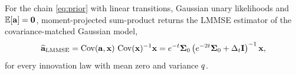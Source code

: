 
\begin{proposition}
\label{prop:lmmse}
For the chain \eqref{eq:prior} with linear transitions, Gaussian unary likelihoods and
$\mathbb{E}[\mathbf{a}]=\mathbf{0}$, moment-projected sum-product returns the LMMSE estimator of the
covariance-matched Gaussian model,
\begin{equation}
\label{eq:lmmse}
\widehat{\mathbf{a}}_{\mathrm{LMMSE}}
= \operatorname{Cov}(\mathbf{a},\mathbf{x})\,\operatorname{Cov}(\mathbf{x})^{-1} \mathbf{x}
= e^{-t}\mathbf{\Sigma}_0\left(e^{-2t}\mathbf{\Sigma}_0 + \Delta_t \mathbf{I}\right)^{-1} \mathbf{x} ,
\end{equation}
for every innovation law with mean zero and variance $q$.
\end{proposition}
